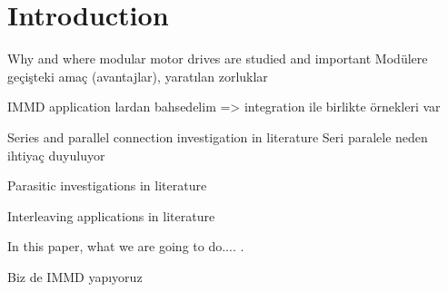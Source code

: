 \section{Introduction}\label{sec:Intro}
Why and where modular motor drives are studied and important
Modülere geçişteki amaç (avantajlar), yaratılan zorluklar

IMMD application lardan bahsedelim => integration ile birlikte örnekleri var

Series and parallel connection investigation in literature
Seri paralele neden ihtiyaç duyuluyor

Parasitic investigations in literature

Interleaving applications in literature

In this paper, what we are going to do.... \cite{Wang2018}. 

Biz de IMMD yapıyoruz

